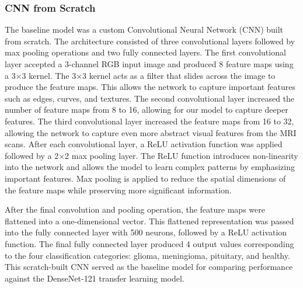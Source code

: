 \documentclass[conference]{IEEEtran}
\begin{document}
\subsubsection{CNN from Scratch}
The baseline model was a custom Convolutional Neural Network (CNN) built from scratch. The architecture consisted of three convolutional layers followed by max pooling operations and two fully connected layers. The first convolutional layer accepted a 3-channel RGB input image and produced 8 feature maps using a 3$\times$3 kernel. The 3$\times$3 kernel acts as a filter that slides across the image to produce the feature maps. This allows the network to capture important features such as edges, curves, and textures. The second convolutional layer increased the number of feature maps from 8 to 16, allowing for our model to capture deeper features. The third convolutional layer increased the feature maps from 16 to 32, allowing the network to capture even more abstract visual features from the MRI scans. After each convolutional layer, a ReLU activation function was applied followed by a 2$\times$2 max pooling layer. The ReLU function introduces non-linearity into the network and allows the model to learn complex patterns by emphasizing important features. Max pooling is applied to reduce the spatial dimensions of the feature maps while preserving more significant information.

After the final convolution and pooling operation, the feature maps were flattened into a one-dimensional vector. This flattened representation was passed into the fully connected layer with 500 neurons, followed by a ReLU activation function. The final fully connected layer produced 4 output values corresponding to the four classification categories: glioma, meningioma, pituitary, and healthy. This scratch-built CNN served as the baseline model for comparing performance against the DenseNet-121 transfer learning model. 
\vspace{0.5cm}
\end{document}
